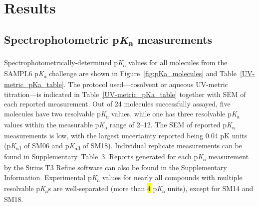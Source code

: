 \documentclass[9pt,lineno]{elife}
\newcommand{\pKa}{p\textit{K}\textsubscript{a}}
\begin{document}
\section{Results}

\subsection{Spectrophotometric \pKa{} measurements}

Spectrophotometrically-determined \pKa{} values for all molecules from the SAMPL6 \pKa{} challenge are shown in Figure~\ref{fig:pKa_molecules} and Table~\ref{UV-metric_pKa_table}. 
The protocol used---cosolvent or aqueous UV-metric titration---is indicated in Table~\ref{UV-metric_pKa_table} together with SEM of each reported measurement. 
Out of 24 molecules successfully assayed, five molecules have two resolvable \pKa{} values, while one has three resolvable \pKa{} values within the measurable \pKa{} range of 2--12. 
The SEM of reported \pKa{} measurements is low, with the largest uncertainty reported being 0.04 pK units (\pKa \textsubscript{1} of SM06 and \pKa \textsubscript{3} of SM18). 
Individual replicate measurements can be found in Supplementary~Table~3. 
Reports generated for each \pKa{} measurement by the Sirius T3 Refine software can also be found in the Supplementary Information. 
Experimental \pKa{} values for nearly all compounds with multiple resolvable \pKa{}s are well-separated (more than \hl{4} \pKa{} units), except for SM14 and SM18.
\end{document}
